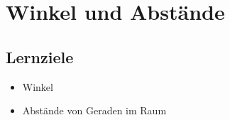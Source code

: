 \section{Winkel und Abstände}

\subsection*{Lernziele}
\begin{itemize}
\item Winkel 
\item Abstände von Geraden im Raum
\end{itemize}


